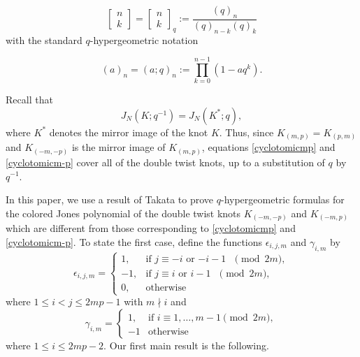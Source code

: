\documentclass[11pt,reqno]{amsart}
\theoremstyle{definition}
\numberwithin{equation}{section}
\begin{document}
\begin{equation}
\begin{bmatrix} n \\ k \end{bmatrix} = \begin{bmatrix} n \\ k \end{bmatrix}_{q} := \frac{(q)_n}{(q)_{n-k} (q)_k}
\end{equation}
with the standard $q$-hypergeometric notation

\begin{equation*}
(a)_n = (a;q)_n := \prod_{k=0}^{n-1} (1-aq^{k}).
\end{equation*}

\noindent Recall that
\begin{equation} \label{mirror}
J_{N}(K; q^{-1}) = J_{N}(K^{*}; q),
\end{equation}
where $K^*$ denotes the mirror image of the knot $K$.   Thus, since $K_{(m,p)} = K_{(p,m)}$ and $K_{(-m,-p)}$ is the mirror image of $K_{(m,p)}$, equations \eqref{cyclotomicmp} and \eqref{cyclotomicm-p} cover all of the double twist knots, up to a substitution of $q$ by $q^{-1}$.   

In this paper, we use a result of Takata \cite{takata} to prove $q$-hypergeometric formulas for the colored Jones polynomial of the double twist knots $K_{(-m,-p)}$ and $K_{(-m,p)}$ which are different from those corresponding to \eqref{cyclotomicmp} and \eqref{cyclotomicm-p}.    To state the first case, define the functions $\epsilon_{i,j,m}$ and $\gamma_{i,m}$ by
\begin{equation} \label{epsilondef}
\epsilon_{i,j,m} = 
\begin{cases}
1, &\text{if $j \equiv -i$ or $-i-1$ $\pmod{2m}$}, \\
-1, &\text{if $j \equiv i$ or $i-1$ $\pmod{2m}$}, \\
0, &\text{otherwise}
\end{cases}
\end{equation}
where $1 \leq i < j \leq 2mp-1$ with $m \nmid i$ and
\begin{equation} \label{gammadef}
\gamma_{i,m} =
\begin{cases}
1, &\text{if $i \equiv 1,\dots, m-1 \pmod{2m}$}, \\
-1 &\text{otherwise}
\end{cases}
\end{equation}
where $1 \leq i \leq 2mp-2$. Our first main result is the following.
\end{document}
